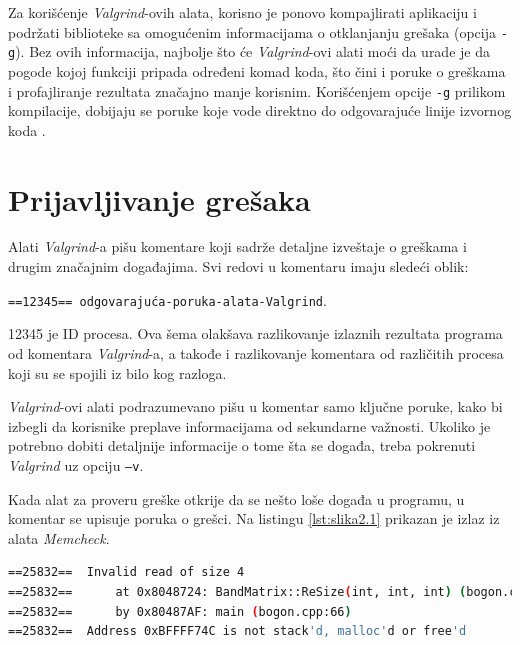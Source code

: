 \documentclass[12pt,oneside]{memoir}
\theoremstyle{plain}
\theoremstyle{definition}
\begin{document}
Za korišćenje \textit{Valgrind}-ovih alata, korisno je ponovo kompajlirati aplikaciju i podržati biblioteke sa omogućenim informacijama o otklanjanju grešaka (opcija \texttt{-g}). Bez ovih informacija, najbolje što će \textit{Valgrind}-ovi alati moći da urade je da pogode kojoj funkciji pripada određeni komad koda, što čini i poruke o greškama i profajliranje rezultata značajno manje korisnim. Korišćenjem opcije \texttt{-g} prilikom kompilacije, dobijaju se poruke koje vode direktno do odgovarajuće linije izvornog koda \cite{ValgrindCore}.

\section{Prijavljivanje grešaka}
Alati \textit{Valgrind}-a pišu komentare koji sadrže detaljne izveštaje o greškama i drugim značajnim događajima. Svi redovi u komentaru imaju sledeći oblik:
\begin{center}
\texttt{==12345== odgovarajuća-poruka-alata-Valgrind}.
\end{center}
12345 je ID procesa. Ova šema olakšava razlikovanje izlaznih rezultata programa od komentara \textit{Valgrind}-a, a takođe i razlikovanje komentara od različitih procesa koji su se spojili iz bilo kog razloga.

\textit{Valgrind}-ovi alati podrazumevano pišu u komentar samo ključne poruke, kako bi izbegli da korisnike preplave informacijama od sekundarne važnosti. Ukoliko je potrebno dobiti detaljnije informacije o tome šta se događa, treba pokrenuti \textit{Valgrind} uz opciju \texttt{–v}.

Kada alat za proveru greške otkrije da se nešto loše događa u programu, u komentar se upisuje poruka o grešci. Na listingu \ref{lst:slika2.1} prikazan je izlaz iz alata \textit{Memcheck}.

\begin{lstlisting}[style=terminal,caption={Primer izlaza alta \textit{Memcheck} \cite{ValgrindCore}}, label={lst:slika2.1},language={bash}]   
==25832==  Invalid read of size 4
==25832==      at 0x8048724: BandMatrix::ReSize(int, int, int) (bogon.cpp:45)
==25832==      by 0x80487AF: main (bogon.cpp:66)
==25832==  Address 0xBFFFF74C is not stack'd, malloc'd or free'd
\end{lstlisting}
\end{document}
